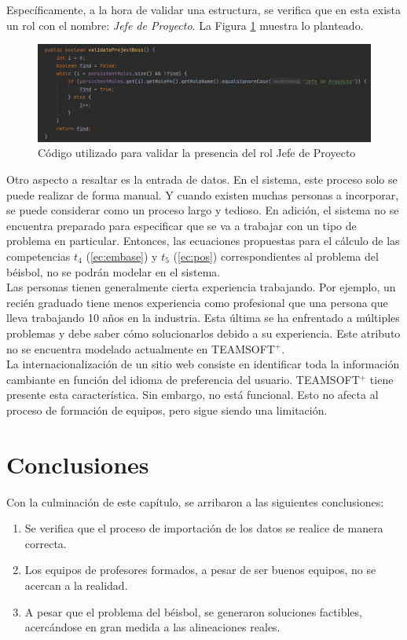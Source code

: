 Específicamente, a la hora de validar una estructura, se verifica que en esta exista un rol con el nombre: \textit{Jefe de Proyecto}. La Figura \ref{fig:cod-valida} muestra lo planteado.

\begin{figure}[H]
	\centering
	\includegraphics[width=\textwidth]{figuras/validate-state.png}
	\caption{Código utilizado para validar la presencia del rol Jefe de Proyecto} \label{fig:cod-valida}
\end{figure}

Otro aspecto a resaltar es la entrada de datos. En el sistema, este proceso solo se puede realizar de forma manual. Y cuando existen muchas personas a incorporar, se puede considerar como un proceso largo y tedioso. En adición, el sistema no se encuentra preparado para especificar que se va a trabajar con un tipo de problema en particular. Entonces, las ecuaciones propuestas para el cálculo de las competencias $t_4$ (\ref{ec:embase}) y $t_5$ (\ref{ec:pos}) correspondientes al problema del béisbol, no se podrán modelar en el sistema. \\

Las personas tienen generalmente cierta experiencia trabajando. Por ejemplo, un recién graduado tiene menos experiencia como profesional que una persona que lleva trabajando 10 años en la industria. Esta última se ha enfrentado a múltiples problemas y debe saber cómo solucionarlos debido a su experiencia. Este atributo no se encuentra modelado actualmente en TEAMSOFT$^+$. \\

La internacionalización de un sitio web consiste en identificar toda la información cambiante en función del idioma de preferencia del usuario. TEAMSOFT$^+$ tiene presente esta característica. Sin embargo, no está funcional. Esto no afecta al proceso de formación de equipos, pero sigue siendo una limitación.

\section{Conclusiones}
Con la culminación de este capítulo, se arribaron a las siguientes conclusiones:
\begin{enumerate}
	\item Se verifica que el proceso de importación de los datos se realice de manera correcta.
	\item Los equipos de profesores formados, a pesar de ser buenos equipos, no se acercan a la realidad.
	\item A pesar que el problema del béisbol, se generaron soluciones factibles, acercándose en gran medida a las alineaciones reales.
\end{enumerate}

